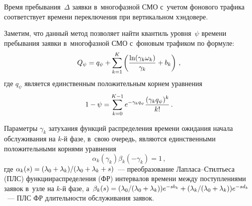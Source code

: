 \begin{multicols}{2}
  Время пребывания~$\Delta$ заявки в~многофазной СМО с~учетом фонового 
трафика соответствует времени переключения при вертикальном хэндовере.
  
  Заметим, что данный метод позволяет найти квантиль уровня~$\psi$ времени 
пребывания заявки в~многофазной СМО с~фоновым трафиком по формуле:
  $$
  Q_\psi= q_\psi +\sum\limits^K_{k=1} \left( \displaystyle\frac{\displaystyle \ln (\gamma_k 
\omega_k)\mathstrut}{\displaystyle \gamma_k\mathstrut}+b_k\right)\,,
  $$
где $q_\psi$ является единственным положительным корнем уравнения
$$
1-\psi= \sum\limits^{K-1}_{k=0} e^{-\gamma_k q_\psi} \displaystyle\frac{\displaystyle (\gamma_k q_\psi)^k\mathstrut}{\displaystyle k!\mathstrut}\,.
$$
  
  Параметры $\gamma_k$ затухания функций распределения времени 
ожидания начала обслуживания на $k$-й фазе, в~свою очередь, являются 
единственными положительными корнями уравнения 
$$
\alpha_k(\gamma_k)\beta_k(-\gamma_k)=1\,,
$$
 где $\alpha_k(s)\hm= 
(\lambda_0\hm+ \lambda_k)/(\lambda_0\hm+\lambda_k\hm+ s)$~--- 
преоб\-разование Лап\-ла\-са--Стилть\-еса (ПЛС) функции\linebreak распределения (ФР) 
интервалов времени между поступлениями заявок в~узле на $k$-й фазе, 
а~$\beta_k(s)\hm= (\lambda_0/(\lambda_0\hm+\lambda_k)) e^{-sb_k}\hm+ 
(\lambda_k/(\lambda_0\hm+ \lambda_k))e^{-sd_k}$~--- ПЛС ФР длительности 
обслуживания заявок.

  \begin{table*}[b]
  {\small \begin{center}
  

\end{center}}
\end{table*}
\end{multicols}
